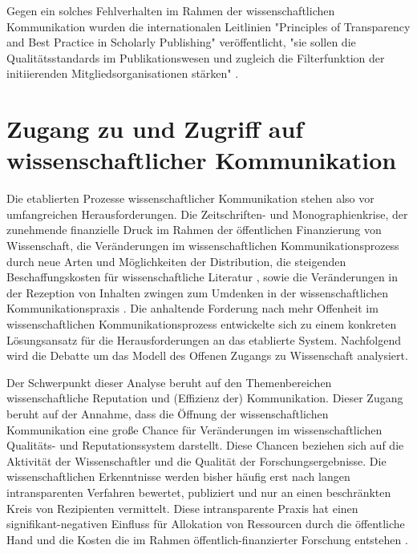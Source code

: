 Gegen ein solches Fehlverhalten im Rahmen der wissenschaftlichen Kommunikation wurden die internationalen Leitlinien "Principles of Transparency and Best Practice in Scholarly Publishing" \cite{oaspa_principles_2013} veröffentlicht, "sie sollen die Qualitätsstandards im Publikationswesen und zugleich die Filterfunktion der initiierenden Mitgliedsorganisationen stärken" \cite{Bargheer_2015}.

\section{Zugang zu und Zugriff auf wissenschaftlicher Kommunikation}

Die etablierten Prozesse wissenschaftlicher Kommunikation stehen also vor umfangreichen Herausforderungen. Die Zeitschriften- und Monographienkrise, der zunehmende finanzielle Druck im Rahmen der öffentlichen Finanzierung von Wissenschaft, die Veränderungen im wissenschaftlichen Kommunikationsprozess durch neue Arten und Möglichkeiten der Distribution, die steigenden Beschaffungskosten für wissenschaftliche Literatur \cite{cite:17} \cite{muller_2010_open}, sowie die Veränderungen in der Rezeption von Inhalten \cite{holub_2013_reception} zwingen zum Umdenken in der wissenschaftlichen Kommunikationspraxis \cite{suchen}. Die anhaltende Forderung nach mehr Offenheit im wissenschaftlichen Kommunikationsprozess entwickelte sich zu einem konkreten Lösungsansatz für die Herausforderungen an das etablierte System. Nachfolgend wird die Debatte um das Modell des Offenen Zugangs zu Wissenschaft analysiert.

Der Schwerpunkt dieser Analyse beruht auf den Themenbereichen wissenschaftliche Reputation und (Effizienz der) Kommunikation. Dieser Zugang beruht auf der Annahme, dass die Öffnung der wissenschaftlichen Kommunikation eine große Chance für Veränderungen im wissenschaftlichen Qualitäts- und Reputationssystem darstellt. Diese Chancen beziehen sich auf die Aktivität der Wissenschaftler und die Qualität der Forschungsergebnisse. Die wissenschaftlichen Erkenntnisse werden bisher häufig erst nach langen intransparenten Verfahren bewertet, publiziert und nur an einen beschränkten Kreis von Rezipienten vermittelt. Diese intransparente Praxis hat einen signifikant-negativen Einfluss für Allokation von Ressourcen durch die öffentliche Hand und die Kosten die im Rahmen öffentlich-finanzierter Forschung entstehen \cite{suchen}.

